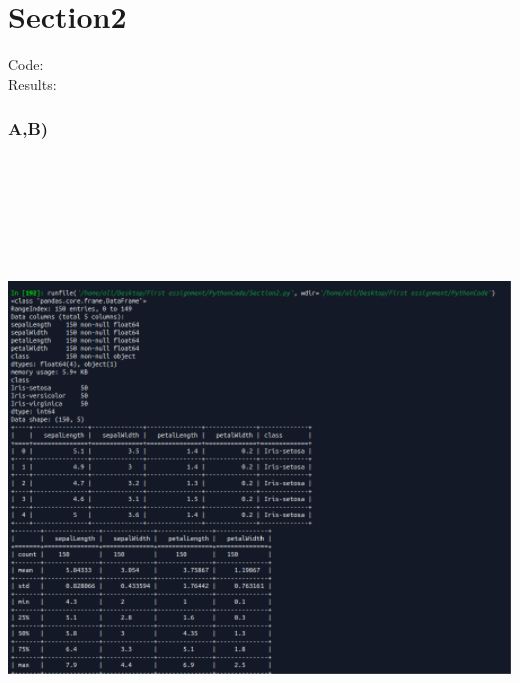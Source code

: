 \documentclass[12pt]{article}
\begin{document}
\section{Section2}
Code:\\

Results:
\subsubsection{A,B)}
\includegraphics[width=15cm, height=17cm]{ss5}
\end{document}
